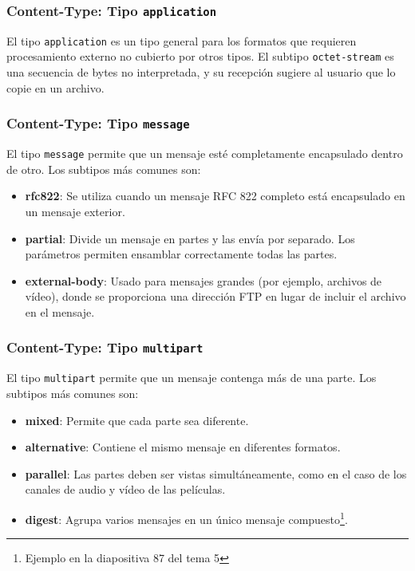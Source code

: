 \documentclass[a4paper,12pt]{article}
\begin{document}
\subsubsection{Content-Type: Tipo \texttt{application}}
El tipo \texttt{application} es un tipo general para los formatos que requieren procesamiento externo no cubierto por otros tipos. El subtipo \texttt{octet-stream} es una secuencia de bytes no interpretada, y su recepción sugiere al usuario que lo copie en un archivo.

\subsubsection{Content-Type: Tipo \texttt{message}}
El tipo \texttt{message} permite que un mensaje esté completamente encapsulado dentro de otro. Los subtipos más comunes son:

\begin{itemize}
    \item \textbf{rfc822}: Se utiliza cuando un mensaje RFC 822 completo está encapsulado en un mensaje exterior.
    \item \textbf{partial}: Divide un mensaje en partes y las envía por separado. Los parámetros permiten ensamblar correctamente todas las partes.
    \item \textbf{external-body}: Usado para mensajes grandes (por ejemplo, archivos de vídeo), donde se proporciona una dirección FTP en lugar de incluir el archivo en el mensaje.
\end{itemize}

\subsubsection{Content-Type: Tipo \texttt{multipart}}
El tipo \texttt{multipart} permite que un mensaje contenga más de una parte. Los subtipos más comunes son:

\begin{itemize}
    \item \textbf{mixed}: Permite que cada parte sea diferente.
    \item \textbf{alternative}: Contiene el mismo mensaje en diferentes formatos.
    \item \textbf{parallel}: Las partes deben ser vistas simultáneamente, como en el caso de los canales de audio y vídeo de las películas.
    \item \textbf{digest}: Agrupa varios mensajes en un único mensaje compuesto\footnote{Ejemplo en la diapositiva 87 del tema 5}.
\end{itemize}
\end{document}
